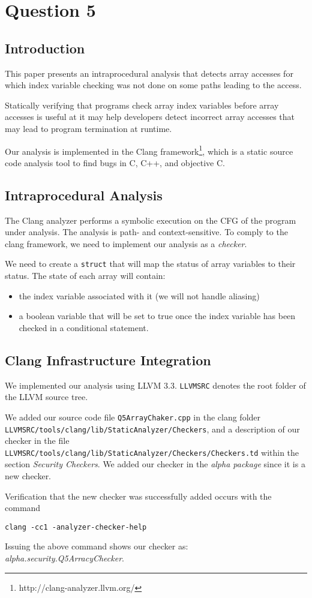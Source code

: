 \section*{Question 5}

\subsection*{Introduction}
This paper presents an intraprocedural analysis that detects
array accesses for which index variable checking was not done
on some paths leading to the access.

Statically verifying that programs check array index variables
before array accesses is useful at it may help developers detect
incorrect array accesses that may lead to program termination
at runtime.

Our analysis is implemented in the
Clang framework\footnote{http://clang-analyzer.llvm.org/},
which is a static source code analysis tool to find bugs in
C, C++, and objective C.

\subsection*{Intraprocedural Analysis}

The Clang analyzer performs a symbolic execution on the CFG
of the program under analysis. The analysis is path- and
context-sensitive. To comply to the clang framework, we need
to implement our analysis as a \textit{checker}. 

We need to create a \texttt{struct} that will map the status
of array variables to their status.
The state of each array will contain:
\begin{itemize}
\item the index variable associated with it (we will not handle aliasing)
\item a boolean variable that will be set to true once the
index variable has been checked in a conditional statement.
\end{itemize}

\subsection*{Clang Infrastructure Integration}

We implemented our analysis using LLVM 3.3.
\texttt{LLVMSRC} denotes the root folder of the LLVM source tree.

We added our source code file \texttt{Q5ArrayChaker.cpp} in the
clang folder \texttt{LLVMSRC/tools/clang/lib/StaticAnalyzer/Checkers},
and a description of our checker in the file
\texttt{LLVMSRC/tools/clang/lib/StaticAnalyzer/Checkers/Checkers.td}
within the section \textit{Security Checkers}. 
We added our checker in the \textit{alpha package} since it is a new checker.

Verification that the new checker was successfully added occurs with the
command
\begin{verbatim}
clang -cc1 -analyzer-checker-help
\end{verbatim}

Issuing the above command shows our checker as: \textit{alpha.security.Q5ArracyChecker}.






